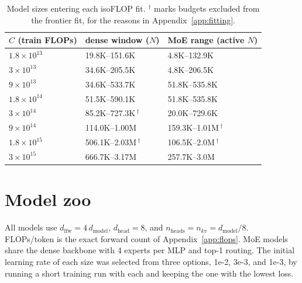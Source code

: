 \documentclass[10pt]{article}
\newcommand{\e}[1]{\times 10^{#1}}
\begin{document}
\begin{table}[H]
\centering
\small
\begin{tabular}{lll}
\toprule
$C$ (train FLOPs) & dense window ($N$) & MoE range (active $N$) \\
\midrule
$1.8\e{13}$ & 19.8K--151.6K & 4.8K--132.9K \\
$3\e{13}$   & 34.6K--205.5K & 4.8K--206.5K \\
$9\e{13}$   & 34.6K--533.7K & 51.8K--535.8K \\
$1.8\e{14}$ & 51.5K--590.1K & 51.8K--535.8K \\
$3\e{14}$   & 85.2K--727.3K\,$^\dagger$ & 20.0K--729.6K \\
$9\e{14}$   & 114.0K--1.00M & 159.3K--1.01M\,$^\dagger$ \\
$1.8\e{15}$ & 506.1K--2.03M\,$^\dagger$ & 106.5K--2.0M\,$^\dagger$ \\
$3\e{15}$   & 666.7K--3.17M & 257.7K--3.0M \\
\bottomrule
\end{tabular}
\caption{Model sizes entering each isoFLOP fit. $^\dagger$ marks budgets
excluded from the frontier fit, for the reasons in
Appendix~\ref{app:fitting}.}
\label{tab:budgets}
\end{table}

\clearpage
\section{Model zoo}
\label{app:zoo}

All models use $d_{\mathrm{ffw}} = 4\,d_{\mathrm{model}}$,
$d_{\mathrm{head}} = 8$, and $n_{\mathrm{heads}} = n_{kv} =
d_{\mathrm{model}} / 8$. FLOPs/token is the exact forward count of
Appendix~\ref{app:flops}. MoE models share the dense backbone with 4 experts
per MLP and top-1 routing. The initial learning rate of each size was
selected from three options, 1e-2, 3e-3, and 1e-3, by running a short
training run with each and keeping the one with the lowest loss.
\end{document}
